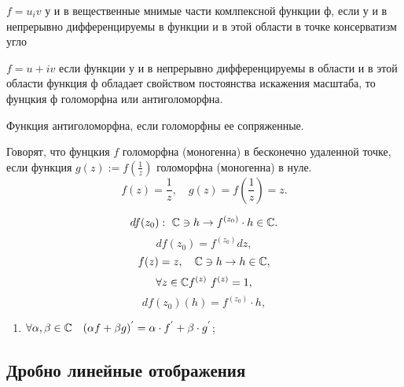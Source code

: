

\begin{theorem}
  $ f=u_iv $ у и в вещественные мнимые части комлпексной функции ф, если у и в непрерывно дифференцируемы в функции и в этой области в точке консерватизм угло
\end{theorem}


\begin{theorem}
  $ f = u+iv $ если функции у и в непрерывно дифференцируемы в области и в этой области функция ф обладает свойством постоянства искажения масштаба, то фунцкия ф голоморфна или антиголоморфна.
\end{theorem}

Функция антиголоморфна, если голоморфны ее сопряженные.

\begin{definition}
  Говорят, что фунцкия $ f $ голоморфна (моногенна) в бесконечно удаленной точке, если функция $ g(z) := f \left(\frac{1}{z}\right) $ голоморфна (моногенна) в нуле.
  \[
      f(z) = \frac{1}{z}, \quad g(z) = f \left(\frac{1}{z}\right) = z.
  \]
\end{definition}

\begin{note}
    \[
        df(z_0): \ \mathbb{C} \ni h \rightarrow f^{(z_0)}\cdot h \in \mathbb{C}.
    \]
    \[
        d f(z_0) = f^{(z_0)}dz,
    \]
    \[
        f(z)=z, \quad \mathbb{C}\ni h \rightarrow h \in \mathbb{C},
    \]
    \[
        \forall z \in \mathbb{C} f^{(z)} \ f^{(z)} = 1,
    \]
    \[
        d f(z_0) (h) = f^{(z_0)}\cdot h,
    \]
\end{note}

\begin{note}\leavevmode
  \begin{enumerate}
      \item $ \forall \alpha,\beta \in \mathbb{C} \quad (\alpha f + \beta g)^{'} = \alpha \cdot f^{'} + \beta \cdot g^{'} $;
  \end{enumerate} 
\end{note}

\subsection{Дробно линейные отображения}

